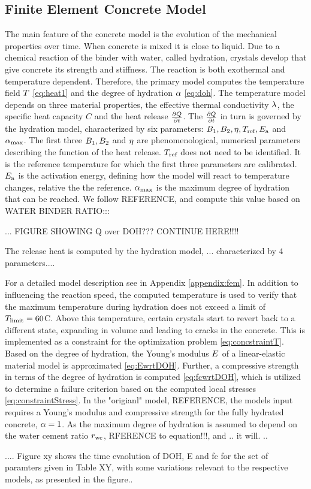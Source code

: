\subsection{Finite Element Concrete Model}
The main feature of the concrete model is the evolution of the mechanical properties over time.
When concrete is mixed it is close to liquid.
Due to a  chemical reaction of the binder with water, called hydration, crystals develop that give concrete its strength and stiffness.
The reaction is both exothermal and temperature dependent.
Therefore, the primary model computes the temperature field $T$ \eqref{eq:heat1} and the degree of hydration $\alpha$ \eqref{eq:doh}.
The temperature model depends on three material properties, the effective thermal conductivity $\lambda$, the specific heat capacity $C$ and the heat release $\frac{\partial Q}{\partial t}$.
The $\frac{\partial Q}{\partial t}$ in turn is governed by the hydration model, characterized by six parameters:
$B_1, B_2, \eta, T_{\text{ref}}, E_{\text{a}}$ and $\alpha_{\text{max}}$.
The first three $B_1, B_2$ and $\eta$ are phenomenological, numerical parameters describing the function of the heat release.
$T_{\text{ref}}$ does not need to be identified.
It is the reference temperature for which the first three parameters are calibrated.
$E_{\text{a}}$ is the activation energy, defining how the model will react to temperature changes, relative the the reference. 
$\alpha_{\text{max}}$ is the maximum degree of hydration that can be reached.
We follow REFERENCE, and compute this value based on WATER BINDER RATIO:::


...
FIGURE SHOWING Q over DOH???
CONTINUE HERE!!!!

The release heat is computed by the hydration model, ... characterized by 4 parameters....

For a detailed model description see in Appendix \ref{appendix:fem}.
In addition to influencing the reaction speed, the computed temperature is used to verify that the maximum temperature during hydration does not exceed a limit of $T_{\text{limit}} = 60$\textdegree C.
Above this temperature, certain crystals start to revert back to a different state, expanding in volume and leading to cracks in the concrete.
This is implemented as a constraint for the optimization problem \eqref{eq:concstraintT}.
Based on the degree of hydration, the Young's modulus $E$ of a linear-elastic material model
is approximated \eqref{eq:EwrtDOH}.
Further, a compressive strength in terms of the degree of hydration is computed \eqref{eq:fcwrtDOH}, which is utilized to determine a failure criterion based on the computed local stresses \eqref{eq:constraintStress}.
In the "origianl" model, REFERENCE, the models input requires a Young's modulus and compressive strength for the fully hydrated concrete, $\alpha = 1$.
As the maximum degree of hydration is assumed to depend on the water cement ratio $r_{\text{wc}}$, RFERENCE to equation!!!, and .. it will.
..  


....
Figure xy shows the time evaolution of DOH, E and fc for the set of paramters given in Table XY, with some variations relevant to the respective models, as presented in the figure..



